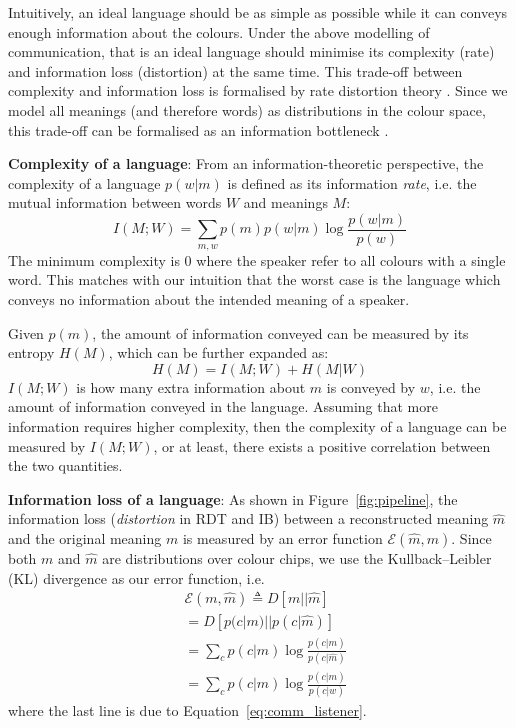 \documentclass[11pt]{article}
\begin{document}
Intuitively, an ideal language should be as simple as possible while it can conveys enough information about the colours. 
Under the above modelling of communication, that is an ideal language should minimise its complexity (rate) and information loss (distortion) at the same time.
This trade-off between complexity and information loss is formalised by rate distortion theory \citep[RDT,][]{shannon1959coding}.
Since we model all meanings (and therefore words) as distributions in the colour space, this trade-off can be formalised as an information bottleneck \citep[IB,][]{tishby2000information}.

\noindent\textbf{Complexity of a language}:
From an information-theoretic perspective, the complexity of a language $p(w|m)$ is defined as its information \emph{rate}, i.e. the mutual information between words $W$ and meanings $M$:
\begin{equation}
    I(M;W) = \sum_{m,w} p(m)p(w|m)\log \frac{p(w|m)}{p(w)}
    \label{eq:comm_complexity_definition}
\end{equation}
The minimum complexity is $0$ where the speaker refer to all colours with a single word. 
This matches with our intuition that the worst case is the language which conveys no information about the intended meaning of a speaker.

Given $p(m)$, the amount of information conveyed can be measured by its entropy $H(M)$, which can be further expanded as:
\begin{equation}
    H(M)=I(M;W)+H(M|W) 
\end{equation}
$I(M;W)$ is how many extra information about $m$ is conveyed by $w$, i.e. the amount of information conveyed in the language.
Assuming that more information requires higher complexity, then the complexity of a language can be measured by $I(M;W)$, or at least, there exists a positive correlation between the two quantities.

\noindent\textbf{Information loss of a language}:
As shown in Figure~\ref{fig:pipeline}, the information loss (\emph{distortion} in RDT and IB) between a reconstructed meaning $\hat{m}$ and the original meaning $m$ is measured by an error function $\mathcal{E}(\hat{m}, m)$.
Since both $m$ and $\hat{m}$ are distributions over colour chips, we use the Kullback–Leibler (KL) divergence as our error function, i.e.
\begin{equation}
\begin{split}
    & \mathcal{E}(m,\hat{m}) \triangleq  D[m||\hat{m}] \\
    & = D[p(c|m)||p(c|\hat{m})]  \\
    & = \sum_{c} p(c|m) \log \frac{p(c|m)}{p(c|\hat{m})} \\
     & = \sum_{c} p(c|m) \log \frac{p(c|m)}{p(c|w)}
\end{split}
\label{eq:comm_loss_function}
\end{equation}
where the last line is due to Equation~\ref{eq:comm_listener}. 
\end{document}

